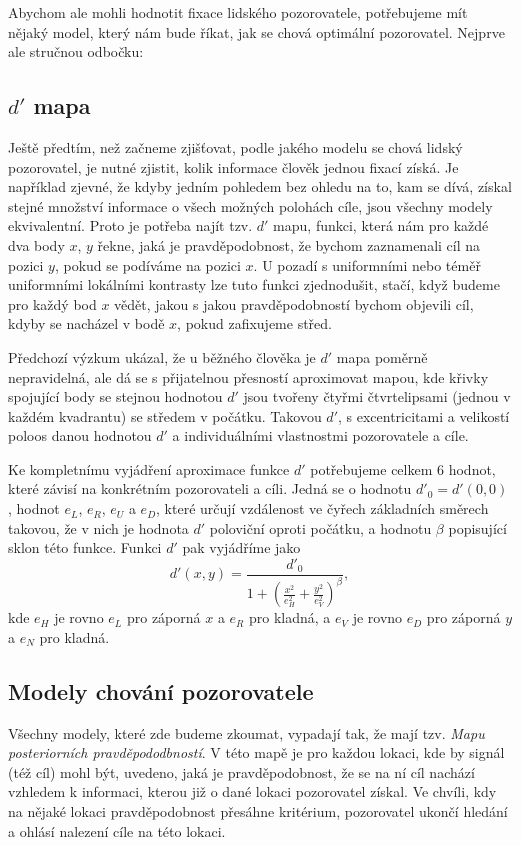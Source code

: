 Abychom ale mohli hodnotit fixace lidského pozorovatele, potřebujeme mít nějaký
model, který nám bude říkat, jak se chová optimální pozorovatel. Nejprve ale
stručnou odbočku:

\subsection{$d'$ mapa}

Ještě předtím, než začneme zjišťovat, podle jakého modelu se chová lidský
pozorovatel, je nutné zjistit, kolik informace člověk jednou fixací získá. Je
například zjevné, že kdyby jedním pohledem bez ohledu na to, kam se dívá,
získal stejné množství informace o všech možných polohách cíle, jsou všechny
modely ekvivalentní. Proto je potřeba najít tzv. $d'$ mapu, funkci, která nám
pro každé dva body $x$, $y$ řekne, jaká je pravděpodobnost, že bychom
zaznamenali cíl na pozici $y$, pokud se podíváme na pozici $x$. U pozadí s
uniformními nebo téměř uniformními lokálními kontrasty lze tuto funkci
zjednodušit, stačí, když budeme pro každý bod $x$ vědět, jakou s jakou
pravděpodobností bychom objevili cíl, kdyby se nacházel v bodě $x$, pokud
zafixujeme střed.

Předchozí výzkum ukázal, že u běžného člověka je $d'$ mapa poměrně
nepravidelná, ale dá se s přijatelnou přesností aproximovat mapou, kde křivky
spojující body se stejnou hodnotou $d'$ jsou tvořeny čtyřmi čtvrtelipsami
(jednou v každém kvadrantu) se středem v počátku. Takovou $d'$, s
excentricitami a velikostí poloos danou hodnotou $d'$ a individuálními
vlastnostmi pozorovatele a cíle. 

Ke kompletnímu vyjádření aproximace funkce $d'$ potřebujeme celkem 6 hodnot,
které závisí na konkrétním pozorovateli a cíli. Jedná se o hodnotu $d'_0 =
d'(0,0)$, hodnot $e_L$, $e_R$, $e_U$ a $e_D$, které určují vzdálenost ve čyřech
základních směrech takovou, že v nich je hodnota $d'$ poloviční oproti počátku,
a hodnotu $\beta$ popisující sklon této funkce. Funkci $d'$ pak vyjádříme jako
$$ d'(x,y) = \frac{d'_0}{1+\left(\frac{x^2}{e_H^2}+\frac{y^2}{e_V^2}
\right)^\beta}, $$ kde $e_H$ je rovno $e_L$ pro záporná $x$ a $e_R$ pro kladná,
a $e_V$ je rovno $e_D$ pro záporná $y$ a $e_N$ pro kladná.


\subsection{Modely chování pozorovatele}

Všechny modely, které zde budeme zkoumat, vypadají tak, že mají tzv. {\it Mapu
posteriorních pravděpododbností}. V této mapě je pro každou lokaci, kde by
signál (též cíl) mohl být, uvedeno, jaká je pravděpodobnost, že se na ní cíl
nachází vzhledem k informaci, kterou již o dané lokaci pozorovatel získal. Ve
chvíli, kdy na nějaké lokaci pravděpodobnost přesáhne kritérium, pozorovatel
ukončí hledání a ohlásí nalezení cíle na této lokaci.

